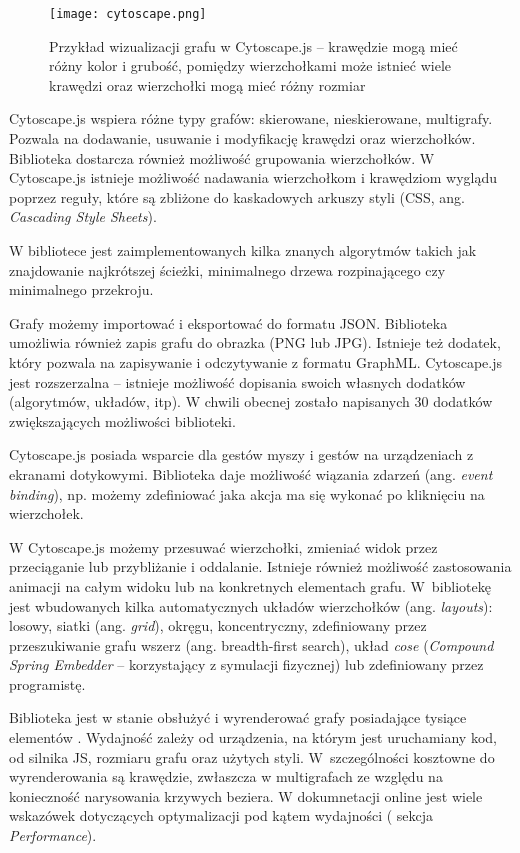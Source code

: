\begin{figure}[H]
\centering
\texttt{[image: cytoscape.png]}
\captionsetup{justification=centering}
\caption{Przykład wizualizacji grafu w Cytoscape.js -- krawędzie mogą mieć różny kolor i grubość, pomiędzy wierzchołkami może istnieć wiele krawędzi oraz wierzchołki mogą mieć różny rozmiar}\label{fig:cytoscape}
\end{figure}

Cytoscape.js wspiera różne typy grafów: skierowane, nieskierowane, multigrafy. Pozwala na dodawanie, usuwanie i modyfikację krawędzi oraz wierzchołków. Biblioteka dostarcza również możliwość grupowania wierzchołków. W Cytoscape.js istnieje możliwość nadawania wierzchołkom i krawędziom wyglądu poprzez reguły, które są zbliżone do kaskadowych arkuszy styli (CSS, ang. \textit{Cascading Style Sheets}).

W bibliotece jest zaimplementowanych kilka znanych algorytmów takich jak znajdowanie najkrótszej ścieżki, minimalnego drzewa rozpinającego czy minimalnego przekroju. 

Grafy możemy importować i eksportować do formatu JSON. Biblioteka umożliwia również zapis grafu do obrazka (PNG lub JPG). Istnieje też dodatek, który pozwala na zapisywanie i odczytywanie z formatu GraphML. Cytoscape.js jest rozszerzalna -- istnieje możliwość dopisania swoich własnych dodatków (algorytmów, układów, itp).  W chwili obecnej zostało napisanych 30 dodatków zwiększających możliwości biblioteki. 

Cytoscape.js posiada wsparcie dla gestów myszy i gestów na urządzeniach z ekranami dotykowymi. Biblioteka daje możliwość wiązania zdarzeń (ang. \textit{event binding}), np. możemy zdefiniować jaka akcja ma się wykonać po kliknięciu na wierzchołek. 

W Cytoscape.js możemy przesuwać wierzchołki, zmieniać widok przez przeciąganie lub przybliżanie i oddalanie. Istnieje również możliwość zastosowania animacji na całym widoku lub na konkretnych elementach grafu. W~bibliotekę jest wbudowanych kilka automatycznych układów wierzchołków (ang. \textit{layouts}): losowy, siatki (ang. \textit{grid}), okręgu, koncentryczny, zdefiniowany przez przeszukiwanie grafu wszerz (ang. breadth-first search), układ \textit{cose} (\textit{Compound Spring Embedder} -- korzystający z symulacji fizycznej) lub zdefiniowany przez programistę. 

Biblioteka jest w stanie obsłużyć i wyrenderować grafy posiadające tysiące elementów \cite[310]{franz}. Wydajność zależy od urządzenia, na którym jest uruchamiany kod, od silnika JS, rozmiaru grafu oraz użytych styli. W~szczególności kosztowne do wyrenderowania są krawędzie, zwłaszcza w multigrafach ze względu na konieczność narysowania krzywych beziera. W dokumnetacji online jest wiele wskazówek dotyczących optymalizacji pod kątem wydajności (\cite{cytoscape} sekcja \textit{Performance}).

